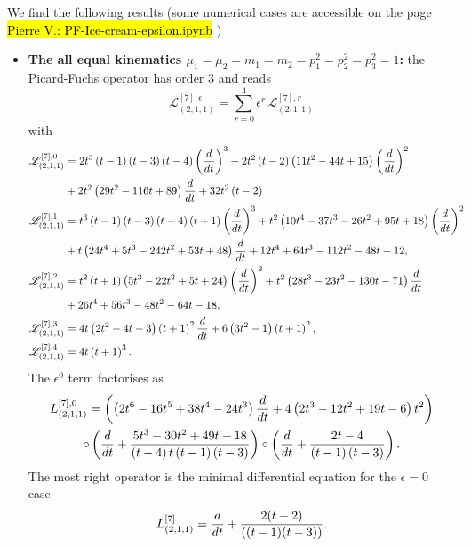 \documentclass[a4paper,12pt]{article}
\numberwithin{equation}{section}
\numberwithin{figure}{section}
\newcommand{\pvnote}[1]{\sethlcolor{bubblegum} \protect\hl{Pierre V.: #1} \sethlcolor{yellow}}
\begin{document}
We find the following results (some numerical cases are accessible on
the page \pvnote{PF-Ice-cream-epsilon.ipynb})
\begin{itemize}
\item {\bf The all equal kinematics
  $\mu_1=\mu_2=m_1=m_2=p_1^2=p_2^2=p_3^2=1$:} the Picard-Fuchs operator
  has order 3 and
  reads
  \begin{equation}
        \mathscr{L}_{(2,1,1)}^{[7],\epsilon}=\sum_{r=0}^4 \epsilon^r\,\mathscr{L}_{(2,1,1)}^{[7],r}
      \end{equation}
with
  \begin{align}
\mathscr{L}_{(2,1,1)}^{[7],0}&= 2 t^{3} \left(t -1\right)
\left(t -3\right) \left(t -4\right) \left(d\over dt\right)^{3}+2 t^{2} \left(t
  -2\right) \left(11 t^{2}-44 t +15\right) \left(d\over dt\right)^{2}\cr&+2 t^{2}
\left(29 t^{2}-116 t +89\right) {d\over dt} +32 t^{2} \left(t
  -2\right)\cr
\mathscr{L}_{(2,1,1)}^{[7],1}&=t^{3} \left(t -1\right) \left(t -3\right) \left(t -4\right) \left(t +1\right) \left(d\over dt\right)^{3}+t^{2} \left(10 t^{4}-37 t^{3}-26 t^{2}+95 t +18\right) \left(d\over dt\right)^{2}\cr&+t \left(24 t^{4}+5 t^{3}-242 t^{2}+53 t +48\right)  {d\over dt} +12 t^{4}+64 t^{3}-112 t^{2}-48 t -12,\cr
\mathscr{L}_{(2,1,1)}^{[7],2}&=t^{2} \left(t +1\right) \left(5 t^{3}-22 t^{2}+5 t +24\right) \left(d\over dt\right)^{2}+t^{2} \left(28 t^{3}-23 t^{2}-130 t -71\right)  {d\over dt} \cr&+26 t^{4}+56 t^{3}-48 t^{2}-64 t -18,\cr
\mathscr{L}_{(2,1,1)}^{[7],3}&=4 t \left(2 t^{2}-4 t -3\right) \left(t +1\right)^{2}
  {d\over dt}+6 \left(3 t^{2}-1\right) \left(t +1\right)^{2},\cr
\mathscr{L}_{(2,1,1)}^{[7],4}&= 4 t \left(t +1\right)^{3}.
\end{align}
The $\epsilon^0$ term factorises as
\begin{multline}
    L_{(2,1,1)}^{[7],0}=\left(
\left(2 t^{6}-16 t^{5}+38 t^{4}-24 t^{3}\right) {{d\over dt}} +4 \left(2 t^{3}-12 t^{2}+19 t -6\right) t^{2}\right)\cr\circ
\left(
{{d\over dt}} +\frac{5 t^{3}-30 t^{2}+49 t -18}{\left(t -4\right) t \left(t -1\right) \left(t -3\right)}
\right)\circ \left({{d\over dt}} +\frac{2 t -4}{\left(t -1\right) \left(t -3\right)}
\right).
\end{multline}
The most right operator is the minimal differential equation for the
$\epsilon=0$ case~\cite{Lairez:2022zkj}
\begin{equation}
  L_{(2,1,1)}^{[7]}= {d\over dt}+ {2(t - 2)\over ((t - 1)(t - 3))  }.
\end{equation}



\end{itemize}
\end{document}
